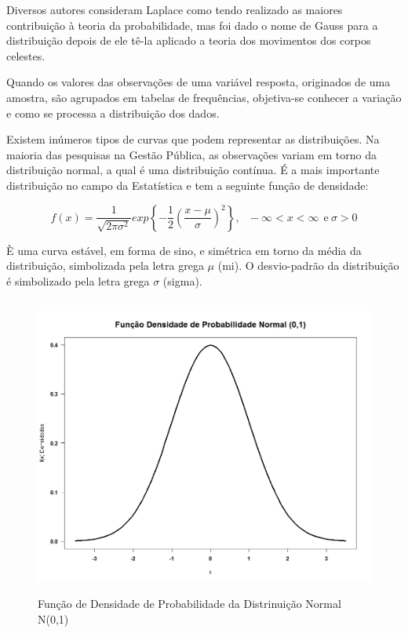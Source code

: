 
\vskip0.3cm 
Diversos autores consideram Laplace como tendo realizado as maiores contribuição à teoria da probabilidade, mas foi dado o nome de Gauss para a distribuição depois de ele tê-la aplicado a teoria dos movimentos dos corpos celestes.\vskip0.3cm 


\inic Quando os valores das observações de uma variável resposta, originados de uma amostra, são agrupados em tabelas de frequências, objetiva-se conhecer a variação e como se processa a distribuição dos dados.\vskip0.3cm 

\inic Existem inúmeros tipos de curvas que podem representar as distribuições. Na maioria das pesquisas na Gestão Pública, as observações variam em torno da distribuição normal, a qual é uma distribuição contínua. É a mais importante distribuição no campo da Estatística e tem a seguinte função de densidade:\vskip0.3cm 


\begin{equation}
f\left(x\right) = \frac{1}{\sqrt{2\pi \sigma^2}}exp \left\{-\frac{1}{2}\left(\frac{x-\mu}{\sigma}\right)^2 \right\},~~~-\infty<x<\infty~~\text{e}~\sigma>0
 \end{equation} 

È uma curva estável, em forma de sino, e simétrica em torno da média da distribuição, simbolizada pela letra grega $\mu$ (mi). O desvio-padrão da distribuição é simbolizado pela letra grega $\sigma$ (sigma).\vskip0.3cm 


\begin{figure}
    \centering
\includegraphics[scale=0.60,height=280pt,width=13cm]{figures/densidade1.jpeg}
    \caption{Função de Densidade de Probabilidade da Distrinuição Normal N(0,1)}
    \label{fig:my_label70}
\end{figure}








